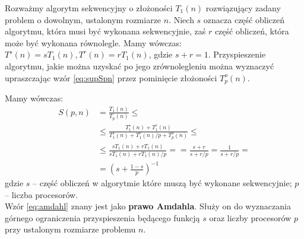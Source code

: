 Rozważmy algorytm sekwencyjny o złożoności \(T_1(n)\) rozwiązujący zadany problem o dowolnym, ustalonym rozmiarze \(n\). Niech \(s\) oznacza część obliczeń algorytmu, która musi być wykonana sekwencyjnie, zaś \(r\) część obliczeń, która może być wykonana równolegle. Mamy wówczas: \(T^{s}(n) = sT_{1}(n), T^{r}(n)=rT_{1}(n)\), gdzie \(s+r=1\). Przyspieszenie algorytmu, jakie można uzyskać po jego zrównolegleniu można wyznaczyć upraszczając wzór \eqref{eq:supSpn} przez pominięcie złożoności \(T^{o}_{p}(n)\).

Mamy wówczas:
\begin{equation}\label{eq:amdahl}
\begin{split}
S(p, n) &= \frac{T_{1}(n)}{T_{p}(n)}\leq\\
&\leq \frac{T^{s}_{1}(n) + T^{r}_{1}(n)}{T^{s}_{1}(n) + T^{r}_{1}(n)/p + T^{o}_{p}(n)}\leq\\
&\leq \frac{sT_{1}(n) + rT_{1}(n)}{sT_{1}(n) + rT_{1}(n)/p} =
= \frac{s+r}{s+r/p} = \frac{1}{s+r/p}= \\
&= \left(s+\frac{1-s}{p}\right)^{-1}
\end{split}
\end{equation}
gdzie \(s\) – część obliczeń w algorytmie które muszą być wykonane sekwencyjnie; \(p\) – liczba procesorów.\\

Wzór \eqref{eq:amdahl} znany jest jako \textbf{prawo Amdahla}. Służy on do wyznaczania górnego ograniczenia przyspieszenia będącego funkcją \(s\) oraz liczby procesorów \(p\) przy ustalonym rozmiarze problemu \(n\).